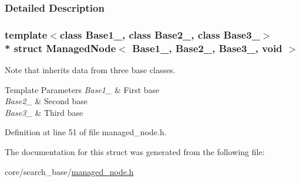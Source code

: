 \subsubsection{Detailed Description}
\subsubsection*{template$<$class Base1\+\_\+, class Base2\+\_\+, class Base3\+\_\+$>$\\*
struct Managed\+Node$<$ Base1\+\_\+, Base2\+\_\+, Base3\+\_\+, void $>$}

Note that inherits data from three base classes. 


\begin{DoxyTemplParams}{Template Parameters}
{\em Base1\+\_\+} & First base \\
\hline
{\em Base2\+\_\+} & Second base \\
\hline
{\em Base3\+\_\+} & Third base \\
\hline
\end{DoxyTemplParams}


Definition at line 51 of file managed\+\_\+node.\+h.



The documentation for this struct was generated from the following file\+:\begin{DoxyCompactItemize}
\item 
core/search\+\_\+base/\hyperlink{managed__node_8h}{managed\+\_\+node.\+h}\end{DoxyCompactItemize}
